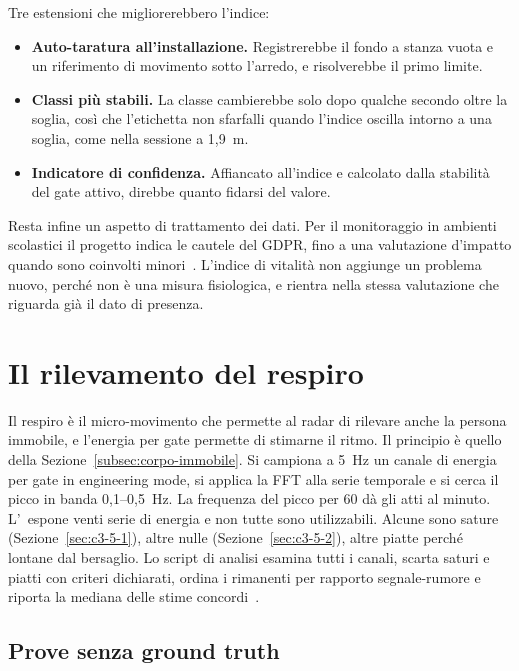 Tre estensioni che migliorerebbero l'indice:

\begin{itemize}
    \item \textbf{Auto-taratura all'installazione.} Registrerebbe il fondo a stanza vuota e un riferimento di movimento sotto l'arredo, e risolverebbe il primo limite.

    \item \textbf{Classi più stabili.} La classe cambierebbe solo dopo qualche secondo oltre la soglia, così che l'etichetta non sfarfalli quando l'indice oscilla intorno a una soglia, come nella sessione a 1,9~m.

    \item \textbf{Indicatore di confidenza.} Affiancato all'indice e calcolato dalla stabilità del gate attivo, direbbe quanto fidarsi del valore.
\end{itemize}

Resta infine un aspetto di trattamento dei dati. Per il monitoraggio in ambienti scolastici il progetto indica le cautele del GDPR, fino a una valutazione d'impatto quando sono coinvolti minori~\cite{callisto2026dipme}. L'indice di vitalità non aggiunge un problema nuovo, perché non è una misura fisiologica, e rientra nella stessa valutazione che riguarda già il dato di presenza.

\section{Il rilevamento del respiro}
\label{sec:respiro}

Il respiro è il micro-movimento che permette al radar di rilevare anche la persona immobile, e l'energia per gate permette di stimarne il ritmo. Il principio è quello della Sezione~\ref{subsec:corpo-immobile}. Si campiona
a 5~Hz un canale di energia per gate in engineering mode, si applica la FFT alla serie
temporale e si cerca il picco in banda 0,1--0,5~Hz. La frequenza del picco per 60 dà
gli atti al minuto. L'\ldb\ espone venti serie di energia e non tutte sono
utilizzabili. Alcune sono sature (Sezione~\ref{sec:c3-5-1}), altre nulle
(Sezione~\ref{sec:c3-5-2}), altre piatte perché lontane dal bersaglio. Lo script di
analisi esamina tutti i canali, scarta saturi e piatti con criteri dichiarati, ordina
i rimanenti per rapporto segnale-rumore e riporta la mediana delle stime concordi~\cite{repoTesi}.

\subsection{Prove senza ground truth}
\label{sec:respiro-senza-gt}

